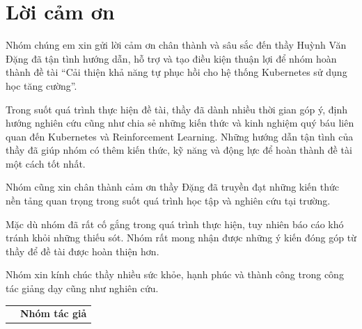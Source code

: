 \chapter*{Lời cảm ơn}

Nhóm chúng em xin gửi lời cảm ơn chân thành và sâu sắc đến thầy Huỳnh Văn Đặng đã tận tình hướng dẫn, hỗ trợ và tạo điều kiện thuận lợi để nhóm hoàn thành đề tài “Cải thiện khả năng tự phục hồi cho hệ thống Kubernetes sử dụng học tăng cường”.

Trong suốt quá trình thực hiện đề tài, thầy đã dành nhiều thời gian góp ý, định hướng nghiên cứu cũng như chia sẻ những kiến thức và kinh nghiệm quý báu liên quan đến Kubernetes và Reinforcement Learning. Những hướng dẫn tận tình của thầy đã giúp nhóm có thêm kiến thức, kỹ năng và động lực để hoàn thành đề tài một cách tốt nhất.

Nhóm cũng xin chân thành cảm ơn thầy Đặng đã truyền đạt những kiến thức nền tảng quan trọng trong suốt quá trình học tập và nghiên cứu tại trường.

Mặc dù nhóm đã rất cố gắng trong quá trình thực hiện, tuy nhiên báo cáo khó tránh khỏi những thiếu sót. Nhóm rất mong nhận được những ý kiến đóng góp từ thầy để đề tài được hoàn thiện hơn.

Nhóm xin kính chúc thầy nhiều sức khỏe, hạnh phúc và thành công trong công tác giảng dạy cũng như nghiên cứu.

{
\begin{table}[ht]
\centering
\begin{tabular}{>{\centering}m{}>{\centering\arraybackslash}m{}}
 & \textbf{Nhóm tác giả}
\end{tabular}
\end{table}
}